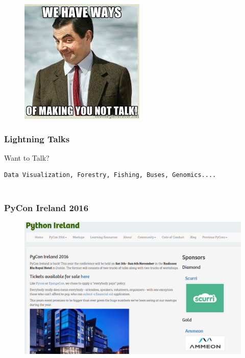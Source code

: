 \documentclass{beamer}
\begin{document}
\begin{frame}
	\begin{figure}
\centering
\includegraphics[width=0.8\linewidth]{bean}

\end{figure}
\end{frame}
\begin{frame}[fragile]
	\frametitle{Lightning Talks}
	
Want to Talk?
\begin{verbatim}
Data Visualization, Forestry, Fishing, Buses, Genomics....


\end{verbatim}	
	
\end{frame}
\begin{frame}
	\frametitle{PyCon Ireland 2016}
	\begin{figure}
		\centering
		\includegraphics[width=1.1\linewidth]{"PyConIreland"}
	\end{figure}	
\end{frame}
\end{document}

